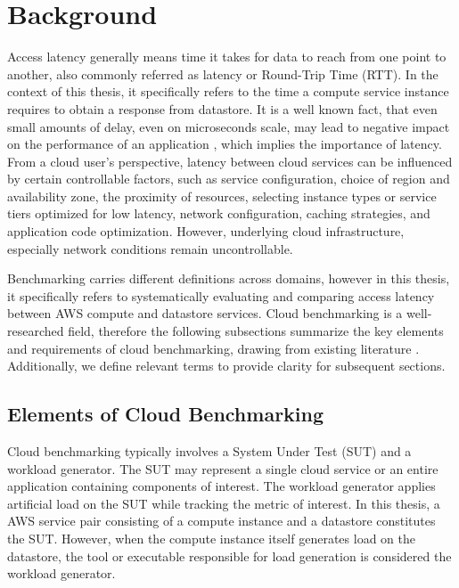 \section{Background}
\label{cha:background}

Access latency generally means time it takes for data to reach from one point to another, also commonly referred as latency or Round-Trip Time (RTT). In the context of this thesis, it specifically refers to the time a compute service instance requires to obtain a response from datastore. It is a well known fact, that even small amounts of delay, even on microseconds scale, may lead to negative impact on the performance of an application \cite{atricle_dean_tail,book_popescu_netlat}, which implies the importance of latency.
%
From a cloud user's perspective, latency between cloud services can be influenced by certain controllable factors, such as service configuration, choice of region and availability zone, the proximity of resources, selecting instance types or service tiers optimized for low latency, network configuration, caching strategies, and application code optimization. However, underlying cloud infrastructure, especially network conditions remain uncontrollable.

Benchmarking carries different definitions across domains, however in this thesis, it specifically refers to systematically evaluating and comparing access latency between AWS compute and datastore services. Cloud benchmarking is a well-researched field, therefore the following subsections summarize the key elements and requirements of cloud benchmarking, drawing from existing literature \cite{paper_binnig_weather,paper_cooper_ycsb,paper_folkerts_benchmarking,book_bermbach_cloud_service_benchmarking}. Additionally, we define relevant terms to provide clarity for subsequent sections.

\subsection{Elements of Cloud Benchmarking}
\label{elems_of_bench}

Cloud benchmarking typically involves a System Under Test (SUT) and a workload generator. The SUT may represent a single cloud service or an entire application containing components of interest. The workload generator applies artificial load on the SUT while tracking the metric of interest. In this thesis, a AWS service pair consisting of a compute instance and a datastore constitutes the SUT. However, when the compute instance itself generates load on the datastore, the tool or executable responsible for load generation is considered the workload generator.

